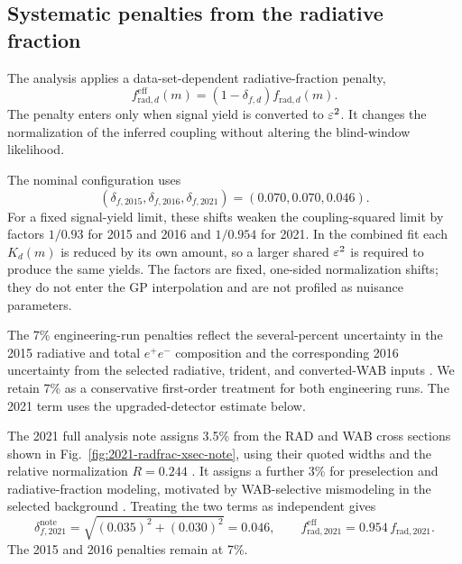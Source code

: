 \subsection{Systematic penalties from the radiative fraction}
\label{sec:radfrac-penalty}

The analysis applies a data-set-dependent radiative-fraction penalty,
\begin{equation}
f_{\mathrm{rad},d}^{\mathrm{eff}}(m)
= \left(1-\delta_{f,d}\right) f_{\mathrm{rad},d}(m).
\label{eq:frad-penalty}
\end{equation}
The penalty enters only when signal yield is converted to $\varepsilon^2$. It changes the
normalization of the inferred coupling without altering the blind-window likelihood.

The nominal configuration uses
\begin{equation}
(\delta_{f,2015},\delta_{f,2016},\delta_{f,2021})=(0.070,0.070,0.046).
\label{eq:frad-penalty-vector}
\end{equation}
For a fixed signal-yield limit, these shifts weaken the coupling-squared limit by
factors $1/0.93$ for 2015 and 2016 and $1/0.954$ for 2021. In the combined fit each
$K_d(m)$ is reduced by its own amount, so a larger shared $\varepsilon^2$ is required to
produce the same yields. The factors are fixed, one-sided normalization shifts; they
do not enter the GP interpolation and are not profiled as nuisance parameters.

The 7\% engineering-run penalties reflect the several-percent uncertainty in the 2015
radiative and total $e^+e^-$ composition and the corresponding 2016 uncertainty from
the selected radiative, trident, and converted-WAB inputs
\cite{HPS2015InternalNote,HPS2016PromptLong}. We retain 7\% as a conservative
first-order treatment for both engineering runs. The 2021 term uses the
upgraded-detector estimate below.

The 2021 full analysis note assigns 3.5\% from the RAD and WAB cross sections shown in
Fig.~\ref{fig:2021-radfrac-xsec-note}, using their quoted widths and the relative
normalization $R=0.244$ \cite[Sec.~9.1, Fig.~161]{HPS2021FullAnalysisNote}. It assigns a
further 3\% for preselection and radiative-fraction modeling, motivated by
WAB-selective mismodeling in the selected background
\cite[Sec.~9.2]{HPS2021FullAnalysisNote}. Treating the two terms as independent gives
\begin{equation}
\delta_{f,2021}^{\mathrm{note}}
= \sqrt{(0.035)^2 + (0.030)^2}
= 0.046,
\qquad
f_{\mathrm{rad},2021}^{\mathrm{eff}}
= 0.954\,f_{\mathrm{rad},2021}.
\label{eq:frad-2021-note-penalty}
\end{equation}
The 2015 and 2016 penalties remain at 7\%.

